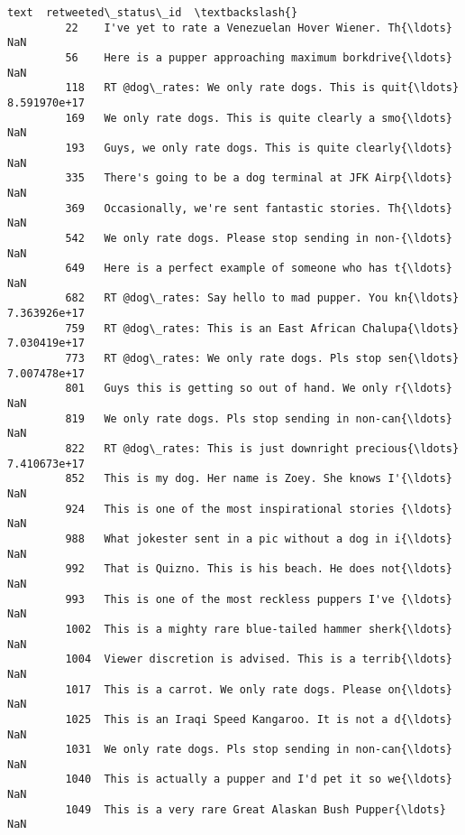 \documentclass[11pt]{article}
\begin{document}
\begin{Verbatim}[commandchars=\\\{\}]
                                                            text  retweeted\_status\_id  \textbackslash{}
         22    I've yet to rate a Venezuelan Hover Wiener. Th{\ldots}                  NaN   
         56    Here is a pupper approaching maximum borkdrive{\ldots}                  NaN   
         118   RT @dog\_rates: We only rate dogs. This is quit{\ldots}         8.591970e+17   
         169   We only rate dogs. This is quite clearly a smo{\ldots}                  NaN   
         193   Guys, we only rate dogs. This is quite clearly{\ldots}                  NaN   
         335   There's going to be a dog terminal at JFK Airp{\ldots}                  NaN   
         369   Occasionally, we're sent fantastic stories. Th{\ldots}                  NaN   
         542   We only rate dogs. Please stop sending in non-{\ldots}                  NaN   
         649   Here is a perfect example of someone who has t{\ldots}                  NaN   
         682   RT @dog\_rates: Say hello to mad pupper. You kn{\ldots}         7.363926e+17   
         759   RT @dog\_rates: This is an East African Chalupa{\ldots}         7.030419e+17   
         773   RT @dog\_rates: We only rate dogs. Pls stop sen{\ldots}         7.007478e+17   
         801   Guys this is getting so out of hand. We only r{\ldots}                  NaN   
         819   We only rate dogs. Pls stop sending in non-can{\ldots}                  NaN   
         822   RT @dog\_rates: This is just downright precious{\ldots}         7.410673e+17   
         852   This is my dog. Her name is Zoey. She knows I'{\ldots}                  NaN   
         924   This is one of the most inspirational stories {\ldots}                  NaN   
         988   What jokester sent in a pic without a dog in i{\ldots}                  NaN   
         992   That is Quizno. This is his beach. He does not{\ldots}                  NaN   
         993   This is one of the most reckless puppers I've {\ldots}                  NaN   
         1002  This is a mighty rare blue-tailed hammer sherk{\ldots}                  NaN   
         1004  Viewer discretion is advised. This is a terrib{\ldots}                  NaN   
         1017  This is a carrot. We only rate dogs. Please on{\ldots}                  NaN   
         1025  This is an Iraqi Speed Kangaroo. It is not a d{\ldots}                  NaN   
         1031  We only rate dogs. Pls stop sending in non-can{\ldots}                  NaN   
         1040  This is actually a pupper and I'd pet it so we{\ldots}                  NaN   
         1049  This is a very rare Great Alaskan Bush Pupper{\ldots}                  NaN   

\end{Verbatim}
\end{document}
